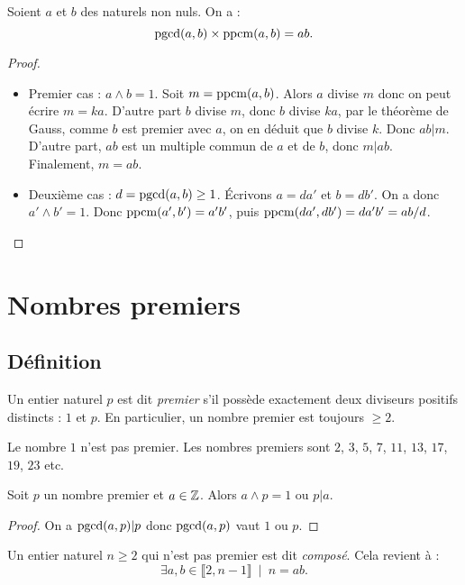 \begin{proposition}
Soient $a$ et $b$ des naturels non nuls. On a :
\[ \operatorname{pgcd}(a,b)\times \operatorname{ppcm}(a,b) = ab.\]
\end{proposition}
\begin{proof}
\begin{itemize}
\item Premier cas : $a\wedge b = 1$. Soit $m = \operatorname{ppcm}(a,b)$. Alors $a$ divise $m$ donc on peut écrire $m = ka$. D'autre part $b$ divise $m$, donc $b$ divise $ka$, par le théorème de Gauss, comme $b$ est premier avec $a$, on en déduit que $b$ divise $k$. Donc $ab|m$. D'autre part, $ab$ est un multiple commun de $a$ et de $b$, donc $m|ab$. Finalement, $m = ab$.
\item Deuxième cas  : $d=\operatorname{pgcd}(a,b) \geq 1$. \'Ecrivons $a = da'$ et $b = db'$. On a donc $a'\wedge b'=1$. Donc $\operatorname{ppcm}(a',b')=a'b'$, puis $\operatorname{ppcm}(da',db') = da'b' = ab/d$.
\end{itemize}
\end{proof}



\section{Nombres premiers}

\subsection{Définition}

\begin{definition}
Un entier naturel $p$ est dit \emph{premier} s'il possède exactement deux diviseurs positifs distincts : $1$ et $p$.
En particulier, un nombre premier est toujours $\geq 2$.

\end{definition}


 Le nombre $1$ n'est pas premier. Les nombres premiers sont $2$, $3$, $5$, $7$, $11$, $13$, $17$, $19$, $23$ etc.
 
\begin{proposition} Soit $p$ un nombre premier et $a\in \mathbb{Z}$. Alors $a\wedge p = 1$  ou $p|a$.
\end{proposition}
\begin{proof}
On a $\operatorname{pgcd}(a,p)|p$ donc $\operatorname{pgcd}(a,p)$ vaut $1$ ou $p$.
\end{proof}


\begin{definition}
Un entier naturel $n\geq 2$ qui n'est pas premier est dit \emph{composé}. Cela revient à :
\[
\exists a, b \in \llbracket 2,n-1 \rrbracket \:\mid\: n=ab.
\]
\end{definition}

